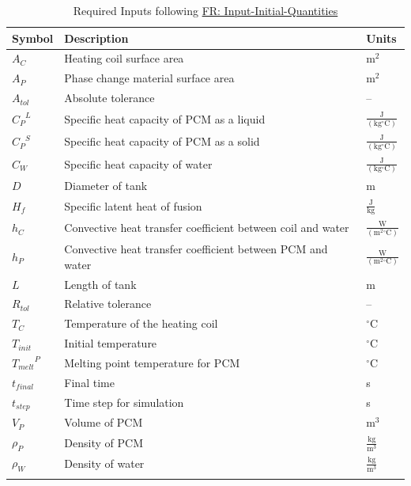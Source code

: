 \documentclass[12pt]{article}
\begin{document}
\begin{longtabu}{l X[l] l}
\toprule
Symbol & Description & Units
\\
\midrule
\endhead
${A_{C}}$ & Heating coil surface area & $\text{m}^{2}$
\\
${A_{P}}$ & Phase change material surface area & $\text{m}^{2}$
\\
${A_{tol}}$ & Absolute tolerance & --
\\
${{C_{P}}^{L}}$ & Specific heat capacity of PCM as a liquid & $\frac{\text{J}}{(\text{kg}{}^{\circ}\text{C})}$
\\
${{C_{P}}^{S}}$ & Specific heat capacity of PCM as a solid & $\frac{\text{J}}{(\text{kg}{}^{\circ}\text{C})}$
\\
${C_{W}}$ & Specific heat capacity of water & $\frac{\text{J}}{(\text{kg}{}^{\circ}\text{C})}$
\\
$D$ & Diameter of tank & m
\\
${H_{f}}$ & Specific latent heat of fusion & $\frac{\text{J}}{\text{kg}}$
\\
${h_{C}}$ & Convective heat transfer coefficient between coil and water & $\frac{\text{W}}{(\text{m}^{2}{}^{\circ}\text{C})}$
\\
${h_{P}}$ & Convective heat transfer coefficient between PCM and water & $\frac{\text{W}}{(\text{m}^{2}{}^{\circ}\text{C})}$
\\
$L$ & Length of tank & m
\\
${R_{tol}}$ & Relative tolerance & --
\\
${T_{C}}$ & Temperature of the heating coil & ${}^{\circ}$C
\\
${T_{init}}$ & Initial temperature & ${}^{\circ}$C
\\
${{T_{melt}}^{P}}$ & Melting point temperature for PCM & ${}^{\circ}$C
\\
${t_{final}}$ & Final time & s
\\
${t_{step}}$ & Time step for simulation & s
\\
${V_{P}}$ & Volume of PCM & $\text{m}^{3}$
\\
${ρ_{P}}$ & Density of PCM & $\frac{\text{kg}}{\text{m}^{3}}$
\\
${ρ_{W}}$ & Density of water & $\frac{\text{kg}}{\text{m}^{3}}$
\\
\bottomrule
\caption{Required Inputs following \hyperref[inputInitQuants]{FR: Input-Initial-Quantities}}
\label{Table:ReqInputs}
\end{longtabu}
\end{document}
